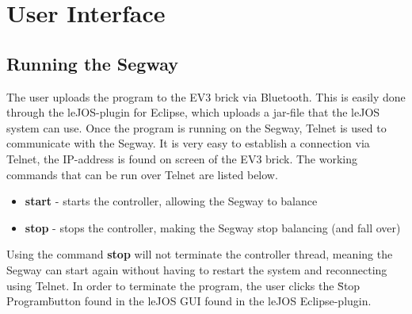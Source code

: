


\section{User Interface}

\subsection{Running the Segway}


The user uploads the program to the EV3 brick via Bluetooth. This is easily done through the leJOS-plugin for Eclipse, which uploads a jar-file that the leJOS system can use.
Once the program is running on the Segway, Telnet is used to communicate with the Segway. It is very easy to establish a connection via Telnet, the IP-address is found on screen of the EV3 brick. The working commands that can be run over Telnet are listed below.

\begin{itemize}
\item \textbf{start} - starts the controller, allowing the Segway to balance
\item \textbf{stop} - stops the controller, making the Segway stop balancing (and fall over)
\end{itemize}

\noindent Using the command \textbf{stop} will not terminate the controller thread, meaning the Segway can start again without having to restart the system and reconnecting using Telnet. In order to terminate the program, the user clicks the \"Stop Program\" button found in the leJOS GUI found in the leJOS Eclipse-plugin.

